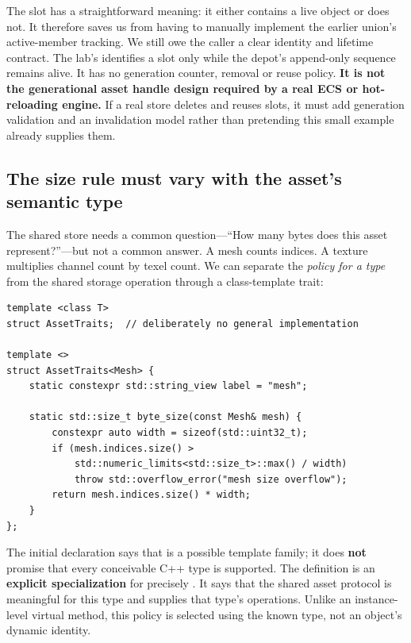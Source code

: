 The  slot has a straightforward meaning: it either contains a live  object or does not. It therefore saves us from having to manually implement the earlier union's active-member tracking. We still owe the caller a clear identity and lifetime contract. The lab's  identifies a slot only while the depot's append-only sequence remains alive. It has no generation counter, removal or reuse policy. \textbf{It is not the generational asset handle design required by a real ECS or hot-reloading engine.} If a real store deletes and reuses slots, it must add generation validation and an invalidation model rather than pretending this small example already supplies them.

\subsection{The size rule must vary with the asset's semantic type}\label{01-foundations-i-ch005-the-size-rule-must-vary-with-the-assets-semantic-type}

\hypertarget{01-foundations-i-ch005-the-size-rule-must-vary-with-the-assets-semantic-type}{}

The shared store needs a common question---``How many bytes does this asset represent?''---but not a common answer. A mesh counts indices. A texture multiplies channel count by texel count. We can separate the \emph{policy for a type} from the shared storage operation through a class-template trait:

\begin{verbatim}
template <class T>
struct AssetTraits;  // deliberately no general implementation

template <>
struct AssetTraits<Mesh> {
    static constexpr std::string_view label = "mesh";

    static std::size_t byte_size(const Mesh& mesh) {
        constexpr auto width = sizeof(std::uint32_t);
        if (mesh.indices.size() >
            std::numeric_limits<std::size_t>::max() / width)
            throw std::overflow_error("mesh size overflow");
        return mesh.indices.size() * width;
    }
};
\end{verbatim}

The initial declaration says that  is a possible template family; it does \textbf{not} promise that every conceivable C++ type is supported. The  definition is an \textbf{explicit specialization} for precisely . It says that the shared asset protocol is meaningful for this type and supplies that type's operations. Unlike an instance-level virtual method, this policy is selected using the known type, not an object's dynamic identity.

